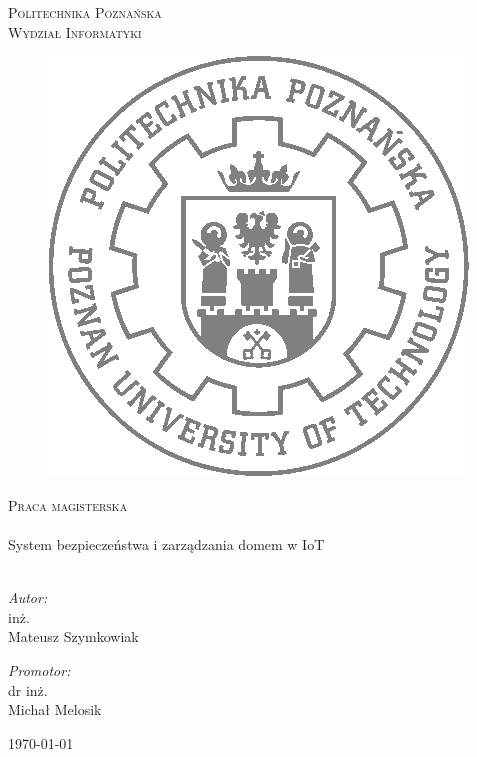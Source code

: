 \begin{titlepage}
	\begin{center}
		\textsc{\LARGE Politechnika Poznańska}\\[0.3cm] 
		\textsc{\large Wydział Informatyki}\\[0.3cm]
		\begin{figure}[!ht]
		\centering
		\includegraphics[scale=0.5]{pictures/logoPP.png}
		\end{figure}
		\textsc{\Large Praca magisterska}\\[0.5cm]
		\HRule \\[0.4cm]
		{ \huge  System bezpieczeństwa i zarządzania domem w IoT\\[0.4cm] }
		\HRule \\[2.5cm]
		\noindent
		\begin{minipage}{0.4\textwidth}
			\begin{flushleft} 
				\large \emph{Autor:}\\ inż. 
				\\Mateusz Szymkowiak
			\end{flushleft}
		\end{minipage}%
		\begin{minipage}{0.4\textwidth}
			\begin{flushright} \large
				\emph{Promotor:} \\ \hfill dr inż. 
				\\Michał Melosik
				
			\end{flushright}
		\end{minipage}
		
		\vfill
		
		{\large \today}
		
		
	\end{center}

\end{titlepage}




